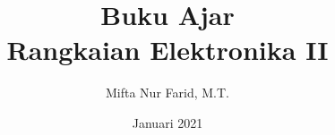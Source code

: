 \documentclass[a4paper,11pt, twoside]{book}
\theoremstyle{definition}
\begin{document}
	
	\author{Mifta Nur Farid, M.T.}

	\title{Buku Ajar\\
		Rangkaian Elektronika II}

	\date{Januari 2021}
	
	\frontmatter

	\maketitle

	\tableofcontents
	
	\mainmatter
	
	
	
	
	\backmatter
	
\end{document}
